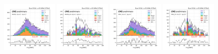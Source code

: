 \begin{figure}
    \includegraphics[width=0.24\textwidth]{chapters/Appendix/sectionQCD/figures/mutau_==1_==1_dilepton_mass.png}
    \includegraphics[width=0.24\textwidth]{chapters/Appendix/sectionQCD/figures/mutau_ss_==1_==1_dilepton_mass.png}
    \includegraphics[width=0.24\textwidth]{chapters/Appendix/sectionQCD/figures/etau_==1_==1_dilepton_mass.png}
    \includegraphics[width=0.24\textwidth]{chapters/Appendix/sectionQCD/figures/etau_ss_==1_==1_dilepton_mass.png}
    

\end{figure}
